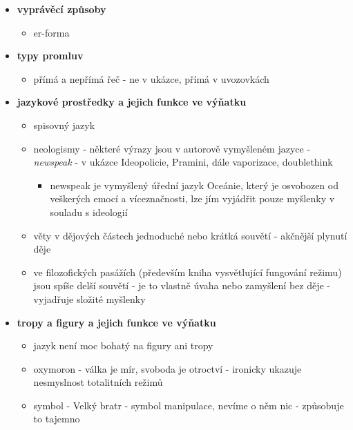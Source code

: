 \documentclass[11pt]{article}
\begin{document}
\begin{itemize}
\begin{itemize}
        \end{itemize}
        \item\textbf{vyprávěcí způsoby}
        \begin{itemize}
            \item er-forma
        \end{itemize}
        \item\textbf{typy promluv}
        \begin{itemize}
            \item přímá a nepřímá řeč - ne v ukázce, přímá v uvozovkách
        \end{itemize}
        \item\textbf{jazykové prostředky a jejich funkce ve výňatku}
        \begin{itemize}
            \item spisovný jazyk
            \item neologismy - některé výrazy jsou v autorově vymyšleném jazyce - \textit{newspeak} - v ukázce Ideopolicie, Pramini, dále vaporizace, doublethink
            \begin{itemize}
                \item newspeak je vymyšlený úřední jazyk Oceánie, který je osvobozen od veškerých emocí a víceznačnosti, lze jím vyjádřit pouze myšlenky v souladu s ideologií
            \end{itemize}
            \item věty v dějových částech jednoduché nebo krátká souvětí - akčnější plynutí děje
            \item ve filozofických pasážích (především kniha vysvětlující fungování režimu) jsou spíše delší souvětí - je to vlastně úvaha nebo zamyšlení bez děje - vyjadřuje složité myšlenky
        \end{itemize}
        \item\textbf{tropy a figury a jejich funkce ve výňatku}
        \begin{itemize}
            \item jazyk není moc bohatý na figury ani tropy
            \item oxymoron - válka je mír, svoboda je otroctví - ironicky ukazuje nesmyslnost totalitních režimů
            \item symbol - Velký bratr - symbol manipulace, nevíme o něm nic - způsobuje to tajemno
        \end{itemize}
    \end{itemize}
\end{document}

